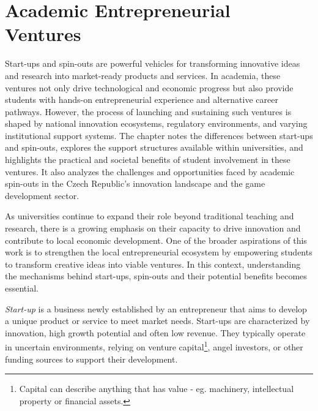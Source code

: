 \chapter{Academic Entrepreneurial Ventures}

\begin{chapterabstract}
	Start-ups and spin-outs are powerful vehicles for transforming innovative ideas and research into market-ready products and services. In academia, these ventures not only drive technological and economic progress but also provide students with hands-on entrepreneurial experience and alternative career pathways. However, the process of launching and sustaining such ventures is shaped by national innovation ecosystems, regulatory environments, and varying institutional support systems. The chapter notes the differences between start-ups and spin-outs, explores the support structures available within universities, and highlights the practical and societal benefits of student involvement in these ventures. It also analyzes the challenges and opportunities faced by academic spin-outs in the Czech Republic’s innovation landscape and the game development sector.
\end{chapterabstract}

As universities continue to expand their role beyond traditional teaching and research, there is a growing emphasis on their capacity to drive innovation and contribute to local economic development. One of the broader aspirations of this work is to strengthen the local entrepreneurial ecosystem by empowering students to transform creative ideas into viable ventures. In this context, understanding the mechanisms behind start-ups, spin-outs and their potential benefits becomes essential.

\textit{Start-up} is a business newly established by an entrepreneur that aims to develop a unique product or service to meet market needs. Start-ups are characterized by innovation, high growth potential and often low revenue. They typically operate in uncertain environments, relying on venture capital\footnote{Capital can describe anything that has value - eg. machinery, intellectual property or financial assets.}, angel investors, or other funding sources to support their development.

